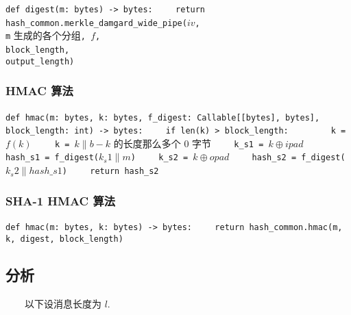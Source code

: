 \documentclass[12pt,a4paper]{article}
\begin{document}
\lstinline{def digest(m: bytes) -> bytes:}
\newline
\lstinline{    return hash_common.merkle_damgard_wide_pipe(}$ iv $\lstinline{, }
\newline
\lstinline{                                                     m} 生成的各个分组\lstinline{, }$ f $\lstinline{, }
\newline
\lstinline{                                                     block_length, }
\newline
\lstinline{                                                     output_length)}

\subsubsection*{HMAC 算法}

\lstinline{def hmac(m: bytes, k: bytes, f_digest: Callable[[bytes], bytes], }
\newline
\lstinline{          block_length: int) -> bytes:}
\newline
\lstinline{    if len(k) > block_length:}
\newline
\lstinline{        k = }$ f(k) $
\newline
\lstinline{    k = }$ k \parallel b - k $ 的长度那么多个 $ 0 $ 字节
\newline
\lstinline{    k_s1 = }$ k \oplus ipad $
\newline
\lstinline{    hash_s1 = f_digest(}$ k_s1 \parallel m $\lstinline{)}
\newline
\lstinline{    k_s2 = }$ k \oplus opad $
\newline
\lstinline{    hash_s2 = f_digest(}$ k_s2 \parallel hash\_s1 $\lstinline{)}
\newline
\lstinline{    return hash_s2}

\subsubsection*{SHA-1 HMAC 算法}

\lstinline{def hmac(m: bytes, k: bytes) -> bytes:}
\newline
\lstinline{    return hash_common.hmac(m, k, digest, block_length)}

\subsection*{分析}

　　以下设消息长度为 $ l $. 
\end{document}

